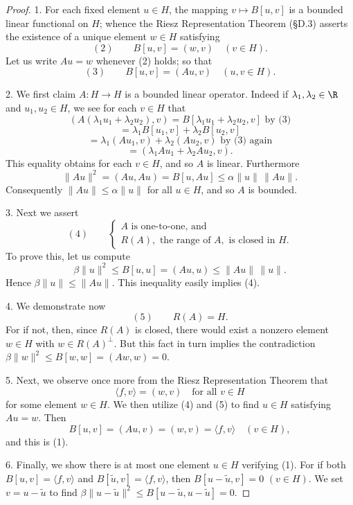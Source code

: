 \begin{proof}
1. For each fixed element $u \in H$, the mapping $v \mapsto B[u,v]$ is a bounded linear functional on $H$; whence the Riesz Representation Theorem (\S D.3) asserts the existence of a unique element $w \in H$ satisfying
$$(2) \qquad B[u,v] = (w,v) \quad (v \in H).$$
Let us write $Au = w$ whenever (2) holds; so that
$$(3) \qquad B[u,v] = (Au,v) \quad (u,v \in H).$$

2. We first claim $A : H \to H$ is a bounded linear operator. Indeed if $\lambda_1,\lambda_2 \in \R$ and $u_1,u_2 \in H$, we see for each $v \in H$ that
$$(A(\lambda_1u_1+\lambda_2u_2),v) = B[\lambda_1u_1+\lambda_2u_2,v] \text{ by (3)}$$
$$= \lambda_1B[u_1,v] + \lambda_2B[u_2,v]$$
$$= \lambda_1(Au_1,v) + \lambda_2(Au_2,v) \text{ by (3) again}$$
$$= (\lambda_1Au_1 + \lambda_2Au_2,v).$$
This equality obtains for each $v \in H$, and so $A$ is linear. Furthermore
$$\|Au\|^2 = (Au,Au) = B[u,Au] \leq \alpha\|u\| \, \|Au\|.$$
Consequently $\|Au\| \leq \alpha\|u\|$ for all $u \in H$, and so $A$ is bounded.

3. Next we assert
$$(4) \qquad \begin{cases} A \text{ is one-to-one, and} \\ R(A), \text{ the range of } A, \text{ is closed in } H. \end{cases}$$
To prove this, let us compute
$$\beta\|u\|^2 \leq B[u,u] = (Au,u) \leq \|Au\| \, \|u\|.$$
Hence $\beta\|u\| \leq \|Au\|$. This inequality easily implies (4).

4. We demonstrate now
$$(5) \qquad R(A) = H.$$
For if not, then, since $R(A)$ is closed, there would exist a nonzero element $w \in H$ with $w \in R(A)^\perp$. But this fact in turn implies the contradiction $\beta\|w\|^2 \leq B[w,w] = (Aw,w) = 0$.

5. Next, we observe once more from the Riesz Representation Theorem that
$$\langle f,v \rangle = (w,v) \quad \text{for all } v \in H$$
for some element $w \in H$. We then utilize (4) and (5) to find $u \in H$ satisfying $Au = w$. Then
$$B[u,v] = (Au,v) = (w,v) = \langle f,v \rangle \quad (v \in H),$$
and this is (1).

6. Finally, we show there is at most one element $u \in H$ verifying (1). For if both $B[u,v] = \langle f,v \rangle$ and $B[\tilde u,v] = \langle f,v \rangle$, then $B[u-\tilde u,v] = 0$ $(v \in H)$. We set $v = u - \tilde u$ to find $\beta\|u-\tilde u\|^2 \leq B[u-\tilde u, u-\tilde u] = 0$.
\end{proof}

